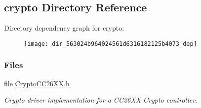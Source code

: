 \subsection{crypto Directory Reference}
\label{dir_563024b964024561d6316182125b4073}
Directory dependency graph for crypto\+:
\nopagebreak
\begin{figure}[H]
\begin{center}
\leavevmode
\texttt{[image: dir\_563024b964024561d6316182125b4073\_dep]}
\end{center}
\end{figure}
\subsubsection*{Files}
\begin{DoxyCompactItemize}
\item 
file \hyperlink{_crypto_c_c26_x_x_8h}{Crypto\+C\+C26\+X\+X.\+h}
\begin{DoxyCompactList}\small\item\em Crypto driver implementation for a C\+C26\+X\+X Crypto controller. \end{DoxyCompactList}\end{DoxyCompactItemize}
